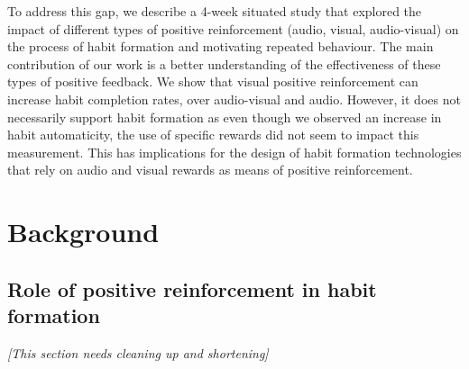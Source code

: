 \documentclass{scaffold/sigchi}
\begin{document}



To address this gap, we describe a 4-week situated study that explored the impact of different types of positive reinforcement (audio, visual, audio-visual) on the process of habit formation and motivating repeated behaviour. The main contribution of our work is a better understanding of the effectiveness of these types of positive feedback. We show that visual positive reinforcement can increase habit completion rates, over audio-visual and audio. However, it does not necessarily support habit formation as even though we observed an increase in habit automaticity, the use of specific rewards did not seem to impact this measurement. This has implications for the design of habit formation technologies that rely on audio and visual rewards as means of positive reinforcement.

\section{Background}
\subsection{Role of positive reinforcement in habit formation}
\emph{[This section needs cleaning up and shortening]}
\end{document}
